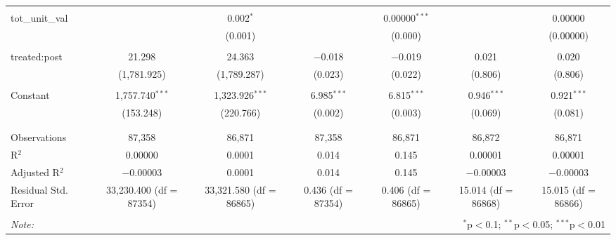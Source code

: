 \begin{table}[H]
{\begin{tabular}{@{\extracolsep{5pt}}lcccccc}
   & & & & & & \\  

  tot\_unit\_val &  & 0.002$^{*}$ &  & 0.00000$^{***}$ &  & 0.00000 \\  

   &  & (0.001) &  & (0.000) &  & (0.00000) \\  

   & & & & & & \\  

  treated:post & 21.298 & 24.363 & $-$0.018 & $-$0.019 & 0.021 & 0.020 \\  

   & (1,781.925) & (1,789.287) & (0.023) & (0.022) & (0.806) & (0.806) \\  

   & & & & & & \\  

  Constant & 1,757.740$^{***}$ & 1,323.926$^{***}$ & 6.985$^{***}$ & 6.815$^{***}$ & 0.946$^{***}$ & 0.921$^{***}$ \\  

   & (153.248) & (220.766) & (0.002) & (0.003) & (0.069) & (0.081) \\  

   & & & & & & \\  

 \hline \\[-1.8ex]  

 Observations & 87,358 & 86,871 & 87,358 & 86,871 & 86,872 & 86,871 \\  

 R$^{2}$ & 0.00000 & 0.0001 & 0.014 & 0.145 & 0.00001 & 0.00001 \\  

 Adjusted R$^{2}$ & $-$0.00003 & 0.0001 & 0.014 & 0.145 & $-$0.00003 & $-$0.00003 \\  

 Residual Std. Error & 33,230.400 (df = 87354) & 33,321.580 (df = 86865) & 0.436 (df = 87354) & 0.406 (df = 86865) & 15.014 (df = 86868) & 15.015 (df = 86866) \\  

 \hline  

 \hline \\[-1.8ex]  

 \textit{Note:}  & \multicolumn{6}{r}{$^{*}$p$<$0.1; $^{**}$p$<$0.05; $^{***}$p$<$0.01} \\  

 \end{tabular}}  

 \end{table}  

